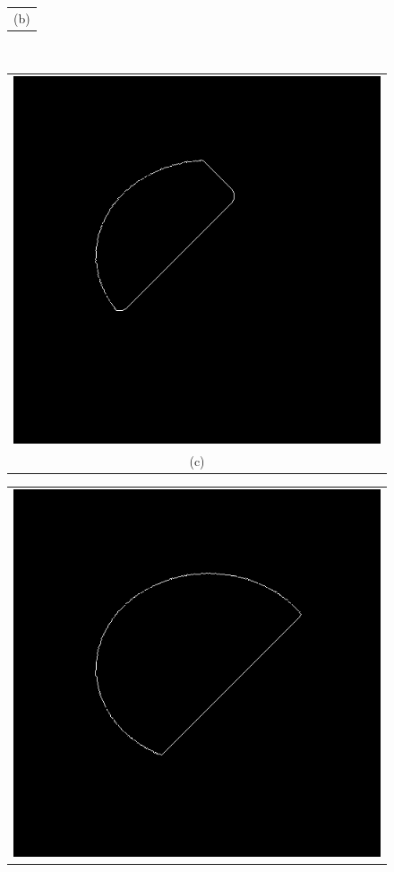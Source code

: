 \begin{figure}[h!]
\begin{minipage}{.49\textwidth}
\begin{tabular}{c}
(b)
\end{tabular}
\end{minipage}
\\
\begin{minipage}{.49\textwidth}
\begin{tabular}{c}
\includegraphics[width=.9\textwidth]{results/2D/circleSeedPartlyOutside800} \\
(c)
\end{tabular}
\end{minipage}
\begin{minipage}{.49\textwidth}
\begin{tabular}{c}
\includegraphics[width=.9\textwidth]{results/2D/circleSeedPartlyOutside1300} \\

\end{tabular}
\end{minipage}
\end{figure}
